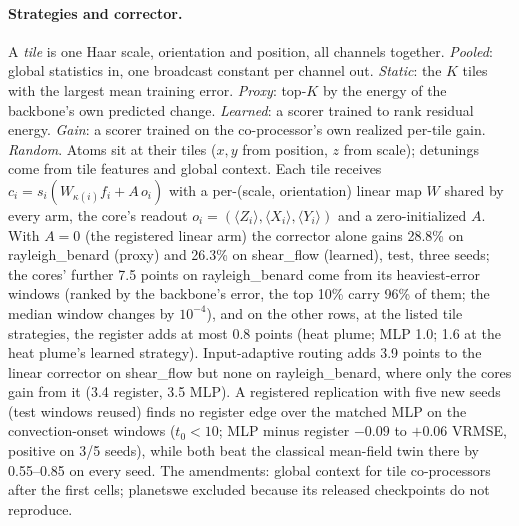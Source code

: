 \documentclass{article}
\begin{document}
\paragraph{Strategies and corrector.} A \emph{tile} is one Haar scale, orientation and position, all channels
together. \emph{Pooled}: global statistics in, one broadcast constant per channel out. \emph{Static}: the $K$ tiles
with the largest mean training error. \emph{Proxy}: top-$K$ by the energy of the backbone's own predicted change.
\emph{Learned}: a scorer trained to rank residual energy. \emph{Gain}: a scorer trained on the co-processor's own
realized per-tile gain. \emph{Random}. Atoms sit at their tiles ($x,y$ from position, $z$ from scale); detunings come from
tile features and global context. Each tile receives $c_i = s_i(W_{\kappa(i)} f_i + A\,o_i)$ with a per-(scale,
orientation) linear map $W$ shared by every arm, the core's readout $o_i = (\langle Z_i\rangle, \langle X_i\rangle,
\langle Y_i\rangle)$ and a zero-initialized $A$. With $A=0$ (the registered linear arm) the corrector alone gains 28.8\%
on rayleigh\_benard (proxy) and 26.3\% on shear\_flow (learned), test, three seeds; the cores' further 7.5 points on
rayleigh\_benard come from its heaviest-error windows (ranked by the backbone's error, the top 10\% carry 96\% of them; the median window changes by
$10^{-4}$), and on the other rows, at the listed tile strategies, the register adds at most 0.8 points (heat plume; MLP 1.0; 1.6 at
the heat plume's learned strategy). Input-adaptive routing adds 3.9 points to the linear corrector on shear\_flow but
none on rayleigh\_benard, where only the cores gain from it (3.4 register, 3.5 MLP). A registered replication with five new seeds (test windows reused) finds no register edge over the matched MLP on the convection-onset windows ($t_0<10$; MLP minus register $-0.09$ to $+0.06$ VRMSE, positive on 3/5 seeds), while both beat the classical mean-field twin there by 0.55--0.85 on every seed. The amendments: global context for tile co-processors after the
first cells; planetswe excluded because its released checkpoints do not reproduce.
\end{document}
